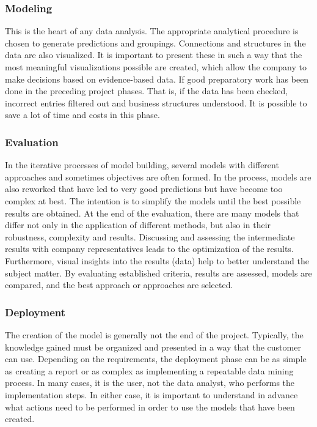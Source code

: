 \subsubsection{Modeling}
This is the heart of any data analysis. The appropriate analytical procedure is chosen to generate predictions and groupings. 
Connections and structures in the data are also visualized. 
It is important to present these in such a way that the most meaningful visualizations possible are created, which allow the company to make decisions based on evidence-based data. 
If good preparatory work has been done in the preceding project phases. That is, if the data has been checked, incorrect entries filtered out and business structures understood. 
It is possible to save a lot of time and costs in this phase.

\subsubsection{Evaluation}
In the iterative processes of model building, several models with different approaches and sometimes objectives are often formed. 
In the process, models are also reworked that have led to very good predictions but have become too complex at best. 
The intention is to simplify the models until the best possible results are obtained. 
At the end of the evaluation, there are many models that differ not only in the application of different methods, but also in their robustness, complexity and results. 
Discussing and assessing the intermediate results with company representatives leads to the optimization of the results. 
Furthermore, visual insights into the results (data) help to better understand the subject matter. 
By evaluating established criteria, results are assessed, models are compared, and the best approach or approaches are selected.

\subsubsection{Deployment}
The creation of the model is generally not the end of the project. Typically, the knowledge gained must be organized and presented in a way that the customer can use. 
Depending on the requirements, the deployment phase can be as simple as creating a report or as complex as implementing a repeatable data mining process. 
In many cases, it is the user, not the data analyst, who performs the implementation steps. 
In either case, it is important to understand in advance what actions need to be performed in order to use the models that have been created.